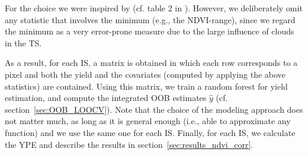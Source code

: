 {{{                %
        }
        For the choice we were inspired by (cf. table 2 in \cite{kamirEstimatingWheatYields2020}). However, we deliberately omit any statistic that involves the minimum (e.g., the NDVI-range), since we regard the minimum as a very error-prone measure due to the large influence of clouds in the {TS}. 
        
        As a result, for each {{IS}}, a matrix is obtained in which each row corresponds to a pixel and both the yield and the covariates (computed by applying the above statistics) are contained.
        Using this matrix, we train a random forest for yield estimation, and compute the integrated OOB estimates $\hat y$ (cf. section~\ref{sec:OOB_LOOCV}). Note that the choice of the modeling approach does not matter much, as long as it is general enough (i.e., able to approximate any function) and we use the same one for each {{IS}}. 
        Finally, for each {{IS}}, we calculate the YPE and describe the results in section~\ref{sec:results_ndvi_corr}.
    }

    
    
    
}



